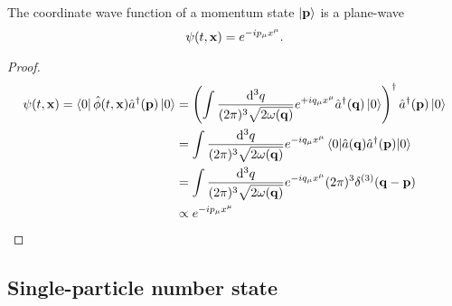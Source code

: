 \begin{lemma}
	The coordinate wave function of a momentum state $\ket{\vb{p}}$ is a plane-wave
	\begin{equation}
		\psi(t,\vb{x})
		=
		e^{-ip_\mu x^\mu}
		.
	\end{equation}
\end{lemma}
\begin{proof}
	\begin{equation}
		\begin{split}
			\psi(t,\vb{x})
			=
			\bra{0}
			\hat\phi(t,\vb{x})
			\hat{a}^\dagger(\vb{p})
			\ket{0}
			&=
			\left(
				\int\frac{\dd[3]{q}}{(2\pi)^3\sqrt{2\omega(\vb{q})}}
				e^{+iq_\mu x^\mu}
				\hat{a}^\dagger(\vb{q})
				\ket{0}
			\right)^\dagger
			\hat{a}^\dagger(\vb{p})
			\ket{0}
			\\
			&=
			\int\frac{\dd[3]{q}}{(2\pi)^3\sqrt{2\omega(\vb{q})}}
			e^{-iq_\mu x^\mu}
			\expval{\hat{a}(\vb{q})\hat{a}^\dagger(\vb{p})}{0}
			\\
			&=
			\int\frac{\dd[3]{q}}{(2\pi)^3\sqrt{2\omega(\vb{q})}}
			e^{-iq_\mu x^\mu}
			(2\pi)^3
			\delta^{(3)}(\vb{q}-\vb{p})
			\\
			&\propto
			e^{-ip_\mu x^\mu}
		\end{split}
	\end{equation}
\end{proof}

\subsection{Single-particle number state}

